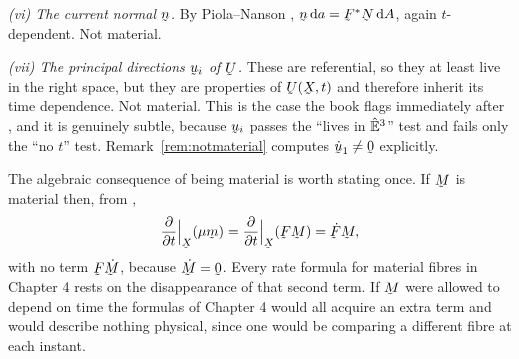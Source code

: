 \begin{remark}
\smallskip\noindent
\emph{(vi) The current normal $\bn$.} By Piola--Nanson ,
$\bn\,\dl a=\bF^{*}\bN\,\dl A$, again $t$-dependent. Not material.

\smallskip\noindent
\emph{(vii) The principal directions $\bu_{i}$ of $\bU$.} These are
referential, so they at least live in the right space, but they are
properties of $\bU(\bX,t)$ and therefore inherit its time dependence. Not
material. This is the case the book flags immediately after , and
it is genuinely subtle, because $\bu_{i}$ passes the ``lives in $\hat{\mathbb{E}}^{3}$''
test and fails only the ``no $t$'' test. Remark~\ref{rem:notmaterial}
computes $\dot\bu_{1}\neq\bze$ explicitly.

\smallskip
The algebraic consequence of being material is worth stating once. If
$\bM$ is material then, from ,
\[
   \frac{\partial}{\partial t}\Big|_{\bX}(\mu\bm)
   =\frac{\partial}{\partial t}\Big|_{\bX}(\bF\bM)=\dot\bF\bM,
\]
with no term $\bF\dot\bM$, because $\dot\bM=\bze$. Every rate formula for
material fibres in Chapter 4 rests on the disappearance of that second
term. If $\bM$ were allowed to depend on time the formulas of Chapter 4
would all acquire an extra term and would describe nothing physical, since
one would be comparing a different fibre at each instant.
\end{remark}

